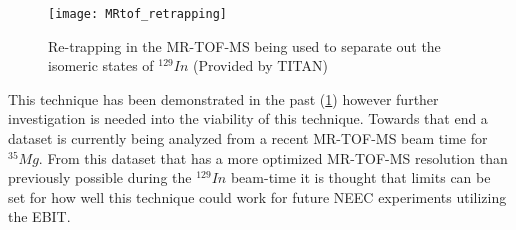 \documentclass[jon_ringuette_thesis_proposal.tex]{subfiles}
\begin{document}
    \begin{figure}[H]
        \begin{center}
            \texttt{[image: MRtof\_retrapping]}
        \end{center}
        \caption{\small Re-trapping in the MR-TOF-MS being used to separate out the isomeric states of $^{129}In$ (Provided by TITAN)}
        \label{fig:mrtof_retrapping_In}
    \end{figure}

    This technique has been demonstrated in the past (\ref{fig:mrtof_retrapping_In}) however further investigation is needed into the viability of this technique.
    Towards that end a dataset is currently being analyzed from a recent MR-TOF-MS beam time for $^{35}Mg$.
    From this dataset that has a more optimized MR-TOF-MS resolution than previously possible during the $^{129}In$ beam-time it is thought that limits can be set for how well this technique could work for future NEEC experiments utilizing the EBIT.

\end{document}
